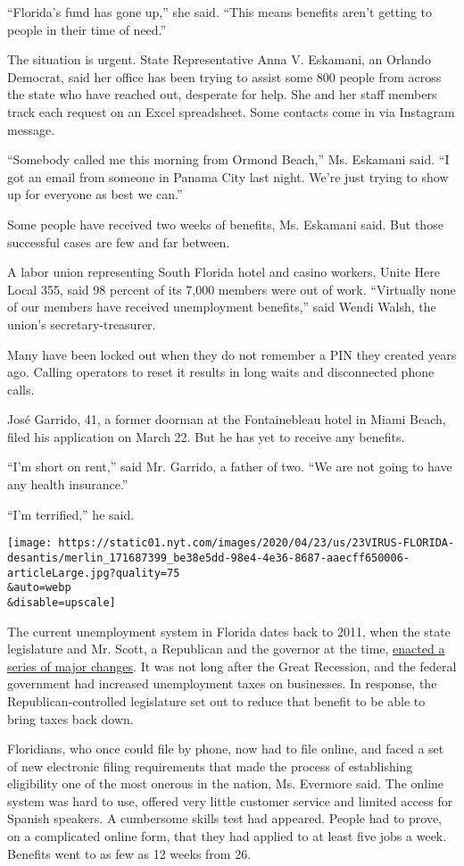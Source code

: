 ``Florida's fund has gone up,'' she said. ``This means benefits aren't
getting to people in their time of need.''

The situation is urgent. State Representative Anna V. Eskamani, an
Orlando Democrat, said her office has been trying to assist some 800
people from across the state who have reached out, desperate for help.
She and her staff members track each request on an Excel spreadsheet.
Some contacts come in via Instagram message.

``Somebody called me this morning from Ormond Beach,'' Ms. Eskamani
said. ``I got an email from someone in Panama City last night. We're
just trying to show up for everyone as best we can.''

Some people have received two weeks of benefits, Ms. Eskamani said. But
those successful cases are few and far between.

A labor union representing South Florida hotel and casino workers, Unite
Here Local 355, said 98 percent of its 7,000 members were out of work.
``Virtually none of our members have received unemployment benefits,''
said Wendi Walsh, the union's secretary-treasurer.

Many have been locked out when they do not remember a PIN they created
years ago. Calling operators to reset it results in long waits and
disconnected phone calls.

José Garrido, 41, a former doorman at the Fontainebleau hotel in Miami
Beach, filed his application on March 22. But he has yet to receive any
benefits.

``I'm short on rent,'' said Mr. Garrido, a father of two. ``We are not
going to have any health insurance.''

``I'm terrified,'' he said.

\texttt{[image: https://static01.nyt.com/images/2020/04/23/us/23VIRUS-FLORIDA-desantis/merlin\_171687399\_be38e5dd-98e4-4e36-8687-aaecff650006-articleLarge.jpg?quality=75\\\&auto=webp\\\&disable=upscale]}

The current unemployment system in Florida dates back to 2011, when the
state legislature and Mr. Scott, a Republican and the governor at the
time,
\href{https://www.nytimes.com/2011/05/08/us/08florida.html}{enacted a
series of major changes}. It was not long after the Great Recession, and
the federal government had increased unemployment taxes on businesses.
In response, the Republican-controlled legislature set out to reduce
that benefit to be able to bring taxes back down.

Floridians, who once could file by phone, now had to file online, and
faced a set of new electronic filing requirements that made the process
of establishing eligibility one of the most onerous in the nation, Ms.
Evermore said. The online system was hard to use, offered very little
customer service and limited access for Spanish speakers. A cumbersome
skills test had appeared. People had to prove, on a complicated online
form, that they had applied to at least five jobs a week. Benefits went
to as few as 12 weeks from 26.


